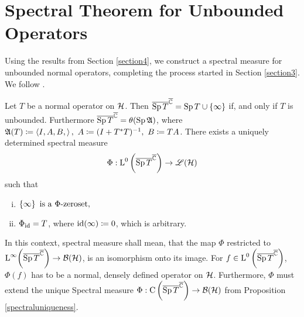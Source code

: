 \section{Spectral Theorem for Unbounded Operators}

Using the results from Section \ref{section4}, we construct a spectral measure
for unbounded normal operators, completing the process started in Section
\ref{section3}. We follow \cite{LesHaupt}.
\begin{thrm}\label{USpectral}
 Let $T$ be a normal operator on $\mathcal{H}$.
 Then $\overline{\operatorname{Sp} T}^{\overline{\mathbb{C}}} = \operatorname{Sp} T \cup \left\lbrace \infty \right\rbrace$ if, and only if 
 $T $ is unbounded.
 Furthermore $\overline{\operatorname{Sp} T}^{\overline{\mathbb{C}}} = \theta(\operatorname{Sp} \mathfrak{A})$, where 
 $\mathfrak{A}(T) \coloneqq \left\langle I, A, B, \right\rangle,~ A \coloneqq (I + T ^{*} T)^{-1},
 ~ B \coloneqq TA$. \newline There exists a uniquely determined spectral measure
 \[
  \Phi : \text{L}^0\left( \overline{\operatorname{Sp} T }^{\overline{\mathbb{C}}} \right) \to \mathscr{L}(\mathcal{H})
 \]
 such that
 \begin{enumerate}[(i)]
  \item $
         \left\lbrace \infty \right\rbrace \text{ is a } \Phi\text{-zeroset},
        $
             
  \item $\Phi_{\operatorname{id}} = T$, where $\operatorname{id}(\infty) \coloneqq 0$, which is arbitrary.
 \end{enumerate}

 In this context, spectral measure shall mean, that the map $\Phi$ restricted to  
 $\text{L}^\infty\!\left( \overline{\operatorname{Sp} T }^{\overline{\mathbb{C}}} \right) \to \mathcal{B}(\mathcal{H})$,
 is an isomorphism onto its image. For $f \in 
 \text{L}^0\left( \overline{\operatorname{Sp} T }^{\overline{\mathbb{C}}} \right)$, $\Phi(f)$ has to be 
 a normal, densely defined operator on $\mathcal{H}$. Furthermore, $\Phi$ must extend the 
 unique Spectral measure $\Phi: \operatorname{C}\left( \overline{\operatorname{Sp} T }^{\overline{\mathbb{C}}} \right) \to 
 \mathcal{B}(\mathcal{H})$ from Proposition \ref{spectraluniqueness}.
\end{thrm}

